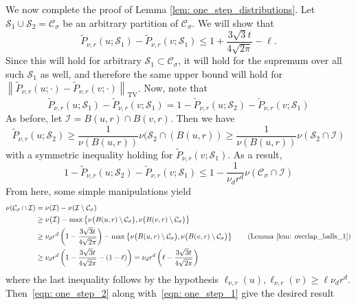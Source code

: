 \documentclass[11pt,twoside]{article}
\theoremstyle{definition}
\newcommand{\set}[1]{\left\{#1\right\}}
\newcommand{\norm}[1]{\left\lVert#1\right\rVert}
\newcommand{\1}{\mathbbm{1}}
\newcommand{\Sset}{\mathcal{S}}
\newcommand{\Cset}{\mathcal{C}}
\newcommand{\Csig}{\Cset_{\sigma}}
\begin{document}
We now complete the proof of Lemma \ref{lem: one_step_distributions}. Let $\Sset_1 \cup \Sset_2 = \Csig$ be an arbitrary partition of $\Csig$. We will show that 
\begin{equation*}
\widetilde{P}_{\nu,r}(u; \Sset_1) - \widetilde{P}_{\nu,r}(v; \Sset_1) \leq 1 + \frac{3 \sqrt{3} t}{4\sqrt{2\pi}} - \ell.
\end{equation*}
Since this will hold for arbitrary $\Sset_1 \subset \Csig$, it will hold for the supremum over all such $\Sset_1$ as well, and therefore the same upper bound will hold for $\norm{\widetilde{P}_{\nu,r}(u; \cdot) - \widetilde{P}_{\nu,r}(v; \cdot)}_{\mathrm{TV}}$. Now, note that
\begin{equation*}
\widetilde{P}_{\nu,r}(u; \Sset_1) - \widetilde{P}_{\nu,r}(v; \Sset_1) = 1 - \widetilde{P}_{\nu,r}(u; \Sset_2) - \widetilde{P}_{\nu,r}(v; \Sset_1)
\end{equation*}
As before, let $\mathcal{I} = B(u,r) \cap B(v,r)$. Then we have
\begin{equation*}
\widetilde{P}_{\nu,r}(u; \Sset_2) \geq \frac{1}{\nu(B(u,r))} \nu(\Sset_2 \cap (B(u,r)) \geq \frac{1}{\nu(B(u,r))} \nu(\Sset_2 \cap \mathcal{I})
\end{equation*}
with a symmetric inequality holding for $\widetilde{P}_{\nu,r}(v; \Sset_1)$. As a result,
\begin{equation}
1 - \widetilde{P}_{\nu,r}(u; \Sset_2) - \widetilde{P}_{\nu,r}(v; \Sset_1) \leq 1 - \frac{1}{\nu_d r^d} \nu(\Csig \cap \mathcal{I}) \label{eqn: one_step_1}
\end{equation}
From here, some simple manipulations yield
\begin{align}
\nu(\Csig \cap \mathcal{I})  & = \nu(\mathcal{I}) - \nu(\mathcal{I} \setminus \Csig) \nonumber \\
& \geq \nu\bigl(\mathcal{I}\bigr) - \max \set{\nu\bigl(B(u,r) \setminus \Csig\bigr), \nu\bigl(B(v,r) \setminus \Csig\bigr)} \nonumber \\
& \geq \nu_d r^d \left(1 - \frac{3 \sqrt{3} t}{4\sqrt{2\pi}}\right) - \max \set{\nu\bigl(B(u,r) \setminus \Csig\bigr), \nu\bigl(B(v,r) \setminus \Csig\bigr)} \tag{Lemma \ref{lem: overlap_balls_1}} \\
& \geq \nu_d r^d \left(1 - \frac{3 \sqrt{3} t}{4\sqrt{2\pi}} - (1 -\ell) \right) = \nu_d r^d\left(\ell - \frac{3 \sqrt{3} t}{4\sqrt{2\pi}}\right) \label{eqn: one_step_2} 
\end{align}
where the last inequality follows by the hypothesis $\ell_{\nu,r}(u),\ell_{\nu,r}(v) \geq \ell \nu_d r^d$. Then~\eqref{eqn: one_step_2} along with~\eqref{eqn: one_step_1} give the desired result
\end{document}
